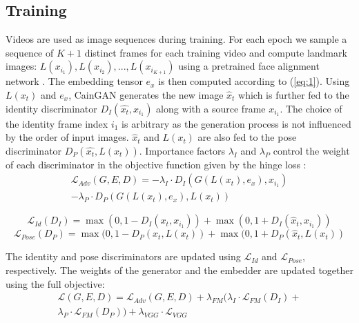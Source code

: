 \documentclass[11pt,a4paper]{article}
\begin{document}
\subsection{Training}
Videos are used as image sequences during training. For each epoch we sample a sequence of $K + 1$ distinct frames for each training video and compute landmark images: $L(x_{i_1}), L(x_{i_2}), ..., L(x_{i_{K+1}})$ using a pretrained face alignment network \cite{bulat2017far}. The embedding tensor $e_x$ is then computed according to (\ref{eq:1}). Using $L(x_t)$ and $e_x$, CainGAN generates the new image $\hat{x}_t$ which is further fed to the identity discriminator $D_I(\hat{x_t}, x_{i_1})$ along with a source frame $x_{i_1}$. The choice of the identity frame index $i_1$ is arbitrary as the generation process is not influenced by the order of input images. $\hat{x}_t$ and $L(x_t)$ are also fed to the pose discriminator $D_P(\hat{x_t}, L(x_t))$. Importance factors $\lambda_I$ and $\lambda_P$ control the weight of each discriminator in the objective function given by the hinge loss \cite{lim2017geometric,miyato2018spectral}:
\begin{equation}
    \begin{aligned}
    \mathcal{L}_{Adv}(G, E, D) = -\lambda_I \cdot D_I(G(L(x_t), e_x), x_{i_1}) \\ -\lambda_P \cdot D_P(G(L(x_t), e_x), L(x_t))
    \end{aligned}
    \label{eq:2}
\end{equation}

\begin{equation}
    \mathcal{L}_{Id}(D_I) = \max(0, 1 - D_I(x_t, x_{i_1})) + \max(0, 1 + D_I(\hat{x}_t, x_{i_1}))
    \label{eq:3}
\end{equation}
\begin{equation}
    \mathcal{L}_{Pose}(D_P) = \max(0, 1 - D_P(x_t, L(x_t)) + \max(0, 1 + D_P(\hat{x}_t, L(x_t))
    \label{eq:4}
\end{equation}

The identity and pose discriminators are updated using $\mathcal{L}_{Id}$ and $\mathcal{L}_{Pose}$, respectively. The weights of the generator and the embedder are updated together using the full objective:
\begin{equation}
    \begin{aligned}
    \mathcal{L}(G, E, D) = \mathcal{L}_{Adv}(G, E, D) +
    \lambda_{FM}(
    \lambda_{I} \cdot \mathcal{L}_{FM}(D_I) + \\ 
    \lambda_{P} \cdot \mathcal{L}_{FM}(D_P)) +
    \lambda_{VGG} \cdot \mathcal{L}_{VGG}
    \end{aligned}
    \label{eq:5}
\end{equation}
\end{document}
